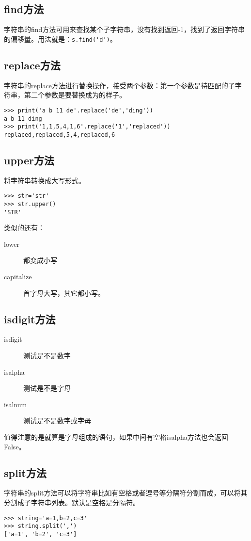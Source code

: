 \documentclass[12pt,oneside]{book}
\begin{document}
\begin{common-format}
\subsection{find方法}
字符串的find方法可用来查找某个子字符串，没有找到返回-1，找到了返回字符串的偏移量。用法就是：\verb+s.find('d')+。


\subsection{replace方法}
字符串的replace方法进行替换操作，接受两个参数：第一个参数是待匹配的子字符串，第二个参数是要替换成为的样子。
\begin{Verbatim}
>>> print('a b 11 de'.replace('de','ding'))
a b 11 ding
>>> print('1,1,5,4,1,6'.replace('1','replaced'))
replaced,replaced,5,4,replaced,6
\end{Verbatim}




\subsection{upper方法}
将字符串转换成大写形式。
\begin{Verbatim}
>>> str='str'
>>> str.upper()
'STR'
\end{Verbatim}

类似的还有：
\begin{description}
\item[lower] 都变成小写
\item[capitalize] 首字母大写，其它都小写。
\end{description}



\subsection{isdigit方法}
\begin{description}
\item[isdigit] 测试是不是数字
\item[isalpha] 测试是不是字母
\item[isalnum] 测试是不是数字或字母
\end{description}

值得注意的是就算是字母组成的语句，如果中间有空格isalpha方法也会返回False。

\subsection{split方法}
字符串的split方法可以将字符串比如有空格或者逗号等分隔符分割而成，可以将其分割成子字符串列表。默认是空格是分隔符。
\begin{Verbatim}
>>> string='a=1,b=2,c=3'
>>> string.split(',')
['a=1', 'b=2', 'c=3']
\end{Verbatim}


\end{common-format}
\end{document}
